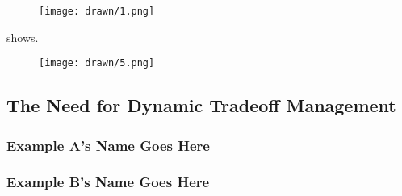 \begin{figure}[ht]
 \centering
  \texttt{[image: drawn/1.png]}
   \caption{}\label{fig:40mb-read-frontier}
\end{figure}

 shows.

\begin{figure}[ht]
 \centering
  \texttt{[image: drawn/5.png]}
   \caption{}\label{fig:energy-latency-linearity}
\end{figure}

\subsection{The Need for Dynamic Tradeoff Management}

\subsubsection{Example A's Name Goes Here}

\subsubsection{Example B's Name Goes Here}
